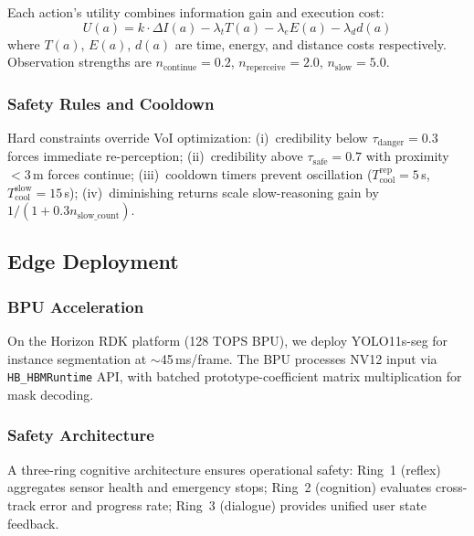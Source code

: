 \documentclass[conference]{IEEEtran}
\begin{document}
Each action's utility combines information gain and execution cost:
\begin{equation}
U(a) = k \cdot \Delta I(a) - \lambda_t T(a) - \lambda_e E(a) - \lambda_d d(a)
\label{eq:utility}
\end{equation}
where $T(a)$, $E(a)$, $d(a)$ are time, energy, and distance costs respectively.
Observation strengths are $n_{\text{continue}}{=}0.2$, $n_{\text{reperceive}}{=}2.0$, $n_{\text{slow}}{=}5.0$.

\subsubsection{Safety Rules and Cooldown}

Hard constraints override VoI optimization:
(i)~credibility below $\tau_{\text{danger}}{=}0.3$ forces immediate re-perception;
(ii)~credibility above $\tau_{\text{safe}}{=}0.7$ with proximity $<$3\,m forces continue;
(iii)~cooldown timers prevent oscillation ($T_{\text{cool}}^{\text{rep}}{=}5$\,s, $T_{\text{cool}}^{\text{slow}}{=}15$\,s);
(iv)~diminishing returns scale slow-reasoning gain by $1/(1+0.3 n_{\text{slow\_count}})$.

\subsection{Edge Deployment}
\label{sec:edge}

\subsubsection{BPU Acceleration}

On the Horizon RDK platform (128 TOPS BPU), we deploy YOLO11s-seg for instance segmentation at $\sim$45\,ms/frame.
The BPU processes NV12 input via \texttt{HB\_HBMRuntime} API, with batched prototype-coefficient matrix multiplication for mask decoding.

\subsubsection{Safety Architecture}

A three-ring cognitive architecture ensures operational safety:
Ring~1 (reflex) aggregates sensor health and emergency stops;
Ring~2 (cognition) evaluates cross-track error and progress rate;
Ring~3 (dialogue) provides unified user state feedback.

\end{document}
